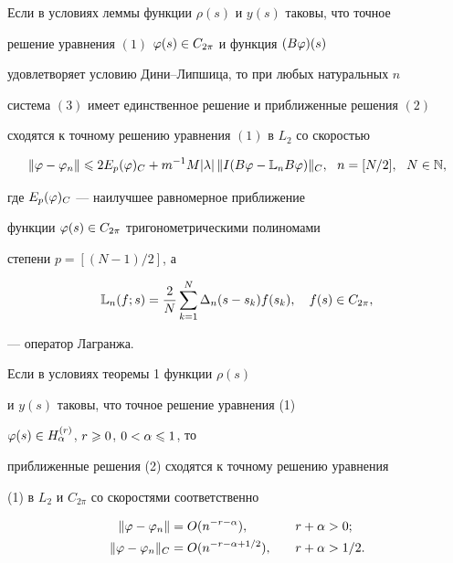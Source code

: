 \begin{thm}


Если в условиях леммы функции $\rho(s)$ и $y(s)$ таковы, что точное 


решение уравнения $(1)$ $\varphi(s)\in C_{2\pi}$ и функция $(B\varphi)(s)$


удовлетворяет условию Дини--Липшица, то при любых натуральных $n$


система $(3)$ имеет единственное решение и приближенные решения $(2)$


сходятся к точному решению уравнения $(1)$ в $L_2$ со скоростью 


$$


\|\vp - \vp_n\|\lea 2E_{p}(\vp)_C + m^{-1}M|\lambda|\,


\|I(B\vp - \L_nB\vp)\|_C,\ \ n=[N/2],\ \ N\in\N,


$$


где $E_p(\varphi)_C$ --- наилучшее равномерное приближение 


функции $\varphi(s)\in C_{2\pi}$ тригонометрическими полиномами 


степени $p = [(N-1)/2]$, а


$$


\L_n(f;s) = \frac{2}{N}\suml_{k=1}^N \Delta_n(s-s_k)f(s_k),\quad 


f(s)\in C_{2\pi},


$$


--- оператор Лагранжа.


\end{thm}





\begin{cornonum}


Если в условиях теоремы 1 функции $\rho(s)$


и $y(s)$ таковы, что точное решение уравнения (1)


$\varphi(s)\in H_\alpha^{(r)}$, $r\geqslant 0$, $0<\alpha\leqslant 1$, то 


приближенные решения (2) сходятся к точному решению уравнения


(1) в $L_2$ и $C_{2\pi}$ со скоростями соответственно


\begin{alignat*}{2}


\|\vp-\vp_n\| &= O(n^{-r-\alpha}),&\quad r+\alpha&>0; \\


%


\|\vp-\vp_n\|_C &= O(n^{-r-\alpha+1/2}),&\quad r+\alpha&>1/2.


\end{alignat*}


\end{cornonum}





